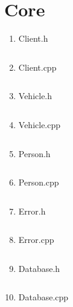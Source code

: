 \documentclass[a4paper, 12pt]{report}
\begin{document}
\newpage
\section{Core}
\begin{enumerate}[left=0pt]
    \item Client.h
    \inputminted{c++}{../SAPEICore/Client.h}
    \item Client.cpp
    \inputminted{c++}{../SAPEICore/Client.cpp}
    \newpage
    \item Vehicle.h
    \inputminted{c++}{../SAPEICore/Vehicle.h}
    \item Vehicle.cpp
    \inputminted{c++}{../SAPEICore/Vehicle.cpp}
    \newpage
    \item Person.h
    \inputminted{c++}{../SAPEICore/Person.h}
    \item Person.cpp
    \inputminted{c++}{../SAPEICore/Person.cpp}
    \newpage
    \item Error.h
    \inputminted{c++}{../SAPEICore/Error.h}
    \item Error.cpp
    \inputminted{c++}{../SAPEICore/Error.cpp}
    \newpage
    \item Database.h
    \inputminted{c++}{../SAPEICore/DataBase.h}
    \item Database.cpp
    \inputminted{c++}{../SAPEICore/DataBase.cpp}
\end{enumerate}

\newpage
\end{document}
